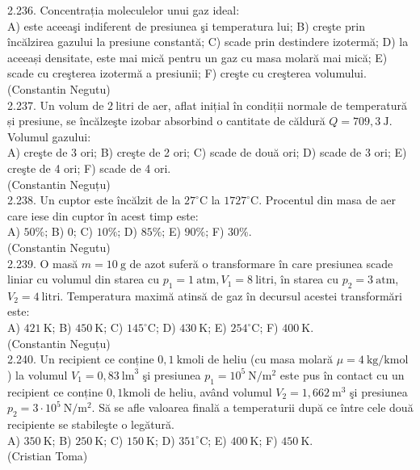 2.236. Concentrația moleculelor unui gaz ideal:\\ A) este aceeaşi indiferent de presiunea şi temperatura lui; B) creşte prin încălzirea gazului la presiune constantă; C) scade prin destindere izotermă; D) la aceeași densitate, este mai mică pentru un gaz cu masa molară mai mică; E) scade cu creşterea izotermă a presiunii; F) creşte cu creşterea volumului.\\ (Constantin Negutu)\\

2.237. Un volum de $2 \mathrm{~litri}$ de aer, aflat inițial în condiții normale de temperatură și presiune, se încălzeşte izobar absorbind o cantitate de căldură $Q=709,3 \mathrm{~J}$. Volumul gazului:\\ A) creşte de 3 ori; B) creşte de 2 ori; C) scade de două ori; D) scade de 3 ori; E) creşte de 4 ori; F) scade de 4 ori.\\ (Constantin Neguțu)\\

2.238. Un cuptor este încălzit de la $27^{\circ} \mathrm{C}$ la $1727^{\circ} \mathrm{C}$. Procentul din masa de aer care iese din cuptor în acest timp este:\\ A) $50 \%$; B) 0; C) $10 \%$; D) $85 \%$; E) $90 \%$; F) $30 \%$.\\ (Constantin Negutu)\\

2.239. O masă $m=10 \mathrm{~g}$ de azot suferă o transformare în care presiunea scade liniar cu volumul din starea cu $p_{1}=1 \mathrm{~atm}, V_{1}=8 \mathrm{~litri}$, în starea cu $p_{2}=3 \mathrm{~atm}$, $V_{2}=4 \mathrm{~litri}$. Temperatura maximă atinsă de gaz în decursul acestei transformări este:\\ A) $421 \mathrm{~K}$; B) $450 \mathrm{~K}$; C) $145^{\circ} \mathrm{C}$; D) $430 \mathrm{~K}$; E) $254^{\circ} \mathrm{C}$; F) $400 \mathrm{~K}$.\\ (Constantin Neguțu)\\

2.240. Un recipient ce conține $0,1 \mathrm{~kmoli}$ de heliu (cu masa molară $\mu=4 \mathrm{~kg} / \mathrm{kmol}$ ) la volumul $V_{1}=0,83 \mathrm{~lm}^{3}$ şi presiunea $p_{1}=10^{5} \mathrm{~N} / \mathrm{m}^{2}$ este pus în contact cu un recipient ce conține $0,1 \mathrm{kmoli}$ de heliu, având volumul $V_{2}=1,662 \mathrm{~m}^{3}$ şi presiunea $p_{2}=3 \cdot 10^{5} \mathrm{~N} / \mathrm{m}^{2}$. Să se afle valoarea finală a temperaturii după ce între cele două recipiente se stabileşte o legătură.\\ A) $350 \mathrm{~K}$; B) $250 \mathrm{~K}$; C) $150 \mathrm{~K}$; D) $351^{\circ} \mathrm{C}$; E) $400 \mathrm{~K}$; F) $450 \mathrm{~K}$.\\ (Cristian Toma)\\

